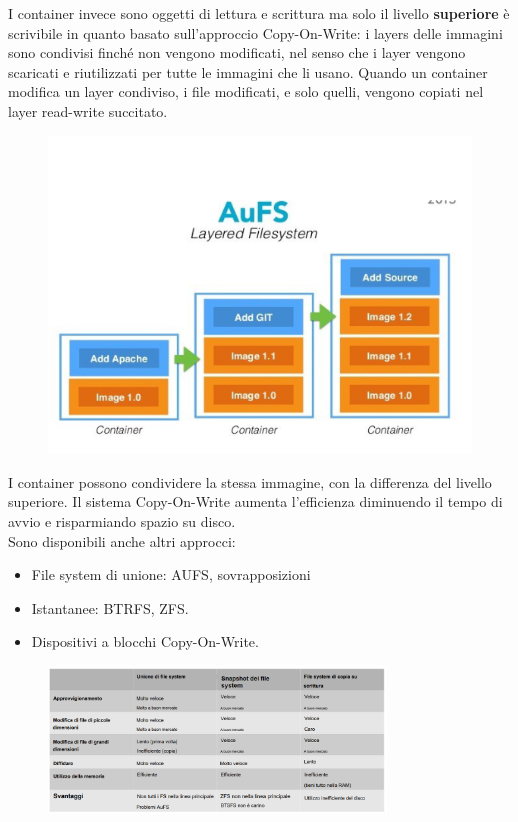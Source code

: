 \documentclass{article}
\begin{document}
		I container invece sono oggetti di lettura e scrittura ma solo il livello \textbf{superiore} è scrivibile in quanto basato sull'approccio Copy-On-Write: i layers delle immagini sono condivisi finché non vengono modificati, nel senso che i layer vengono scaricati e riutilizzati per tutte le immagini che li usano. Quando un container modifica un layer condiviso, i file modificati, e solo quelli, vengono copiati nel layer read-write succitato.
		\begin{figure}[ht]
			\centering
			\includegraphics[width=0.5\linewidth]{images/SAC_B5_layeredfs}

			\label{fig:sacb5layeredfs}
		\end{figure}
		
		I container possono condividere la stessa immagine, con la differenza del livello superiore. Il sistema Copy-On-Write aumenta l'efficienza diminuendo il tempo di avvio e risparmiando spazio su disco.\\
		Sono disponibili anche altri approcci:
		\begin{itemize}
		    \item File system di unione: AUFS, sovrapposizioni
		    \item Istantanee: BTRFS, ZFS.
		    \item Dispositivi a blocchi Copy-On-Write.
		\end{itemize}
		\begin{figure}[ht]
		    \centering
		    \includegraphics[width=0.8\textwidth]{SAC_B2_DockerFileSystem.png}
		\end{figure}
		
\end{document}
